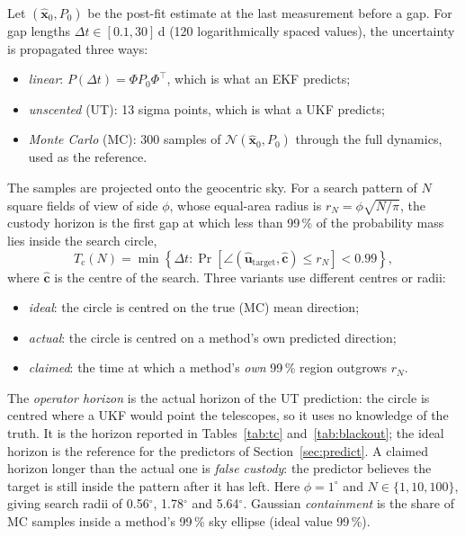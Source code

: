 \documentclass[pdflatex,sn-mathphys-num]{sn-jnl}
\newcommand{\Tc}{T_{\mathrm{c}}}
\newcommand{\vect}[1]{\bm{#1}}
\begin{document}
Let $(\hat{\vect x}_0, P_0)$ be the post-fit estimate at the last measurement before a gap. For
gap lengths $\Delta t \in [0.1, 30]$\,d (120 logarithmically spaced values), the uncertainty is
propagated three ways:
\begin{itemize}
\item \emph{linear}: $P(\Delta t) = \Phi P_0 \Phi^\top$, which is what an EKF predicts;
\item \emph{unscented} (UT): 13 sigma points, which is what a UKF predicts;
\item \emph{Monte Carlo} (MC): 300 samples of $\mathcal N(\hat{\vect x}_0, P_0)$ through the full
      dynamics, used as the reference.
\end{itemize}
The samples are projected onto the geocentric sky. For a search pattern of $N$ square fields of
view of side $\phi$, whose equal-area radius is $r_N = \phi\sqrt{N/\pi}$, the custody horizon is the
first gap at which less than 99\,\% of the probability mass lies inside the search circle,
\begin{equation}
\Tc(N) = \min\left\{\Delta t : \Pr\left[\angle(\hat{\vect u}_{\mathrm{target}}, \hat{\vect c}) \le r_N\right] < 0.99\right\},
\end{equation}
where $\hat{\vect c}$ is the centre of the search. Three variants use different centres or radii:
\begin{itemize}
\item \emph{ideal}: the circle is centred on the true (MC) mean direction;
\item \emph{actual}: the circle is centred on a method's own predicted direction;
\item \emph{claimed}: the time at which a method's \emph{own} 99\,\% region outgrows $r_N$.
\end{itemize}
The \emph{operator horizon} is the actual horizon of the UT prediction: the circle is centred where a
UKF would point the telescopes, so it uses no knowledge of the truth. It is the horizon reported in
Tables~\ref{tab:tc} and~\ref{tab:blackout}; the ideal horizon is the reference for the predictors of
Section~\ref{sec:predict}. A claimed horizon longer than the actual one is \emph{false custody}: the
predictor believes the target is still inside the pattern after it has left. Here $\phi = 1^\circ$ and
$N \in \{1, 10, 100\}$, giving search radii of 0.56$^\circ$, 1.78$^\circ$ and 5.64$^\circ$. Gaussian
\emph{containment} is the share of MC samples inside a method's 99\,\% sky ellipse (ideal value
99\,\%).
\end{document}
